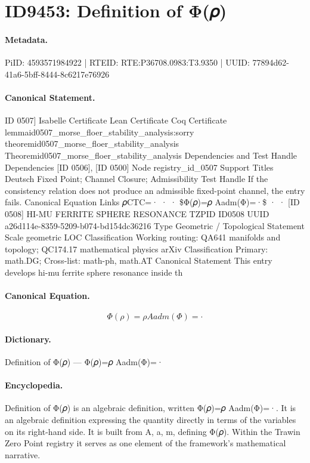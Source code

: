 \section*{ID9453: Definition of Φ(𝜌)}
\paragraph{Metadata.}
PiID: 4593571984922 | RTEID: RTE:P36708.0983:T3.9350 | UUID: 77894d62-41a6-5bff-8444-8c6217e76926

\paragraph{Canonical Statement.}
ID 0507] Isabelle Certificate Lean Certificate Coq Certificate lemmaid0507\_morse\_floer\_stability\_analysis:sorry theoremid0507\_morse\_floer\_stability\_analysis Theoremid0507\_morse\_floer\_stability\_analysis Dependencies and Test Handle Dependencies [ID 0506], [ID 0500] Node registry\_id\_0507 Support Titles Deutsch Fixed Point; Channel Closure; Admissibility Test Handle If the consistency relation does not produce an admissible fixed-point channel, the entry fails. Canonical Equation Links 𝜌CTC=· · · \$Φ(𝜌)=𝜌 Aadm(Φ)=·\$ · · [ID 0508] HI-MU FERRITE SPHERE RESONANCE TZPID ID0508 UUID a26d114e-8359-5209-b074-bd154dc36216 Type Geometric / Topological Statement Scale geometric LOC Classification Working routing: QA641 manifolds and topology; QC174.17 mathematical physics arXiv Classification Primary: math.DG; Cross-list: math-ph, math.AT Canonical Statement This entry develops hi-mu ferrite sphere resonance inside th

\paragraph{Canonical Equation.}
\[
Φ(𝜌)=𝜌 Aadm(Φ)=·
\]

\paragraph{Dictionary.}
Definition of Φ(𝜌) — Φ(𝜌)=𝜌 Aadm(Φ)=·

\paragraph{Encyclopedia.}
Definition of Φ(𝜌) is an algebraic definition, written Φ(𝜌)=𝜌 Aadm(Φ)=·. It is an algebraic definition expressing the quantity directly in terms of the variables on its right-hand side. It is built from A, a, m, defining Φ(𝜌). Within the Trawin Zero Point registry it serves as one element of the framework's mathematical narrative.
